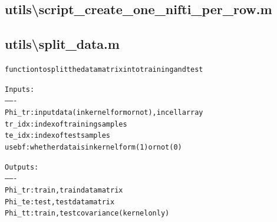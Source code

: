 \subsection{utils\textbackslash script\_create\_one\_nifti\_per\_row.m}
\begin{alltt}

\end{alltt}


\subsection{utils\textbackslash split\_data.m}
\begin{alltt}

 function to split the data matrix into training and test
 
 Inputs:
 -------
 Phi\_tr: input data (in kernel form or not), in cell array
 tr\_idx: index of training samples
 te\_idx: index of test samples
 usebf : whether data is in kernel form (1) or not (0)
 
 Outputs:
 -------
 Phi\_tr: train,train data matrix
 Phi\_te: test,test data matrix
 Phi\_tt: train,test covariance (kernel only)
\end{alltt}


